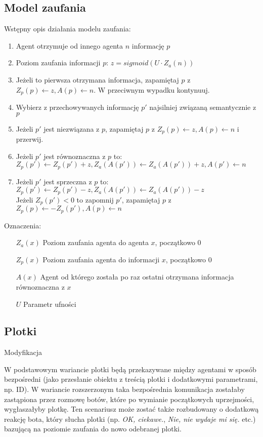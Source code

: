 \documentclass{article}
\begin{document}
	\subsection{Model zaufania}
	Wstępny opis działania modelu zaufania:
	\begin{enumerate}
		\item Agent otrzymuje od innego agenta $n$ informację $p$
		\item Poziom zaufania informacji $p$: $ z = sigmoid(U \cdot Z_a(n)) $
		\item Jeżeli to pierwsza otrzymana informacja,
		zapamiętaj $p$ z $ Z_p(p) \leftarrow z, A(p) \leftarrow n $.
		W przeciwnym wypadku kontynuuj.
		\item Wybierz z przechowywanych informację $p'$ najsilniej związaną semantycznie z $p$
		\item Jeżeli $p'$ jest niezwiązana z $p$, zapamiętaj $p$ z $ Z_p(p) \leftarrow z, A(p) \leftarrow n $ i przerwij.
		\item Jeżeli $p'$ jest równoznaczna z $p$ to:\\
		$ Z_p(p') \leftarrow Z_p(p') + z, Z_a(A(p')) \leftarrow Z_a(A(p')) + z , A(p') \leftarrow n $
		\item Jeżeli $p'$ jest sprzeczna z $p$ to:\\
		$ Z_p(p') \leftarrow Z_p(p') - z, Z_a(A(p')) \leftarrow Z_a(A(p')) - z$\\
		Jeżeli $ Z_p(p') < 0 $ to zapomnij $p'$, zapamiętaj $p$ z\\
		$ Z_p(p) \leftarrow -Z_p(p'), A(p) \leftarrow n $
	\end{enumerate}
	Oznaczenia:
	\begin{itemize}
		\item[$Z_a(x)$] Poziom zaufania agenta do agenta $x$, początkowo $0$
		\item[$Z_p(x)$] Poziom zaufania agenta do informacji $x$, początkowo $0$
		\item[$A(x)$] Agent od którego została po raz ostatni otrzymana informacja równoznaczna z $x$
		
		\item[$U$] Parametr ufności
		
	\end{itemize}
	\subsection{Plotki}
	\begin{description}
		\item{Modyfikacja}
		
	W podstawowym wariancie plotki będą przekazywane między agentami w sposób bezpośredni (jako przesłanie obiektu z treścią plotki i dodatkowymi parametrami, np. ID). W wariancie rozszerzonym taka bezpośrednia komunikacja zostałaby zastąpiona przez rozmowę botów, które po wymianie początkowych uprzejmości, wygłaszałyby plotkę. Ten scenariusz może zostać także rozbudowany o dodatkową reakcję bota, który słucha plotki (np. \textit{OK, ciekawe.}, \textit{Nie, nie wydaje mi się.} etc.) bazującą na poziomie zaufania do nowo odebranej plotki.
	\end{description}
\end{document}
